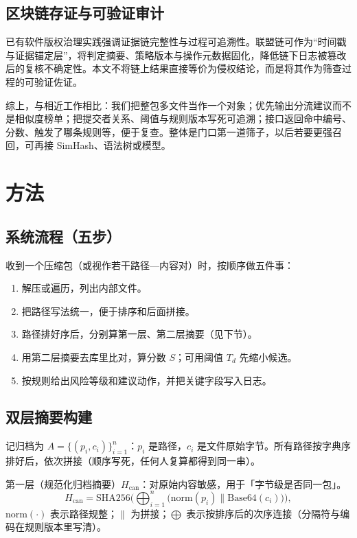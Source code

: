 \documentclass[UTF8,a4paper,zihao=5]{ctexart}
\begin{document}
\subsection{区块链存证与可验证审计}
已有软件版权治理实践强调证据链完整性与过程可追溯性\cite{cnReg2002,cnRules2013,sft01582023}。联盟链可作为“时间戳与证据锚定层”，将判定摘要、策略版本与操作元数据固化，降低链下日志被篡改后的复核不确定性。本文不将链上结果直接等价为侵权结论，而是将其作为筛查过程的可验证佐证。

综上，与相近工作相比：我们把整包多文件当作一个对象；优先输出分流建议而不是相似度榜单；把提交者关系、阈值与规则版本写死可追溯；接口返回命中编号、分数、触发了哪条规则等，便于复查。整体是门口第一道筛子，以后若要更强召回，可再接 SimHash、语法树或模型。

\section{方法}
\label{sec:method}

\subsection{系统流程（五步）}
收到一个压缩包（或视作若干路径—内容对）时，按顺序做五件事：
\begin{enumerate}[leftmargin=2em]
  \item 解压或遍历，列出内部文件。
  \item 把路径写法统一，便于排序和后面拼接。
  \item 路径排好序后，分别算第一层、第二层摘要（见下节）。
  \item 用第二层摘要去库里比对，算分数 $S$；可用阈值 $T_d$ 先缩小候选。
  \item 按规则给出风险等级和建议动作，并把关键字段写入日志。
\end{enumerate}

\subsection{双层摘要构建}
\label{sec:dual-digest}
记归档为 $A=\{(p_i,c_i)\}_{i=1}^{n}$：$p_i$ 是路径，$c_i$ 是文件原始字节。所有路径按字典序排好后，依次拼接（顺序写死，任何人复算都得到同一串）。

第一层（规范化归档摘要）$H_{\mathrm{can}}$：对原始内容敏感，用于「字节级是否同一包」。
\begin{equation}
H_{\mathrm{can}} = \mathrm{SHA256}\Big(\bigoplus_{i=1}^{n}\bigl(\mathrm{norm}(p_i) \parallel \mathrm{Base64}(c_i)\bigr)\Big),
\end{equation}
$\mathrm{norm}(\cdot)$ 表示路径规整；$\parallel$ 为拼接；$\bigoplus$ 表示按排序后的次序连接（分隔符与编码在规则版本里写清）。
\end{document}

